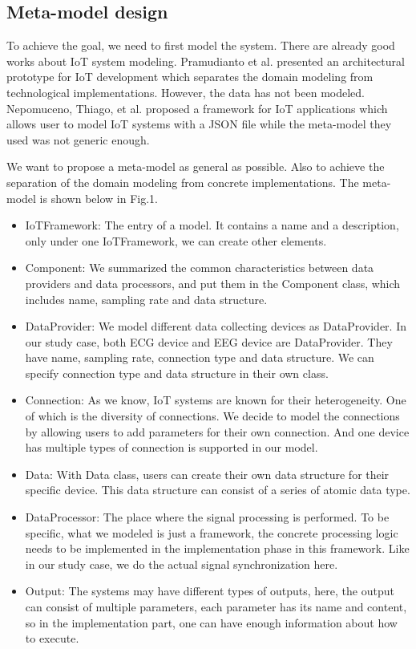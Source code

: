 \documentclass[11pt, oneside]{article}   	%
\begin{document}
\subsection{Meta-model design}
\indent \par To achieve the goal, we need to first model the system. There are already good works about IoT system modeling. Pramudianto et al.\cite{ref14} presented an architectural prototype for IoT development which separates the domain modeling from technological implementations. However, the data has not been modeled. Nepomuceno, Thiago, et al.\cite{ref15}  proposed a framework for IoT applications which allows user to model IoT systems with a JSON file while the meta-model they used was not generic enough. \\
\indent \par We want to propose a meta-model as general as possible. Also to achieve the separation of the domain modeling from concrete implementations. The meta-model is shown below in Fig.1.
\begin{itemize}
\item IoTFramework: The entry of a model. It contains a name and a description, only under one IoTFramework, we can create other elements. 
\item Component: We summarized the common characteristics between data providers and data processors, and put them in the Component class, which includes name, sampling rate and data structure.
\item DataProvider: We model different data collecting devices as DataProvider. In our study case, both ECG device and EEG device are DataProvider. They have name, sampling rate, connection type and data structure. We can specify connection type and data structure in their own class.
\item Connection: As we know, IoT systems are known for their heterogeneity. One of which is the diversity of connections. We decide to model the connections by allowing users to add parameters for their own connection. And one device has multiple types of connection is supported in our model.
\item Data: With Data class, users can create their own data structure for their specific device. This data structure can consist of a series of atomic data type.
\item DataProcessor: The place where the signal processing is performed. To be specific, what we modeled is just a framework, the concrete processing logic needs to be implemented in the implementation phase in this framework. Like in our study case, we do the actual signal synchronization here.
\item Output: The systems may have different types of outputs, here, the output can consist of multiple parameters, each parameter has its name and content, so in the implementation part, one can have enough information about how to execute. 
\end{itemize}
\end{document}
